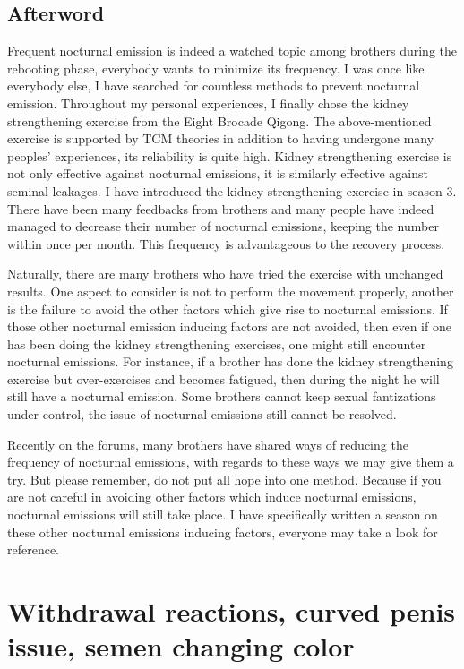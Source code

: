 \documentclass[
]{book}
\begin{document}
\hypertarget{afterword-6}{%
\section{Afterword}\label{afterword-6}}

Frequent nocturnal emission is indeed a watched topic among brothers during the rebooting phase, everybody wants to minimize its frequency. I was once like everybody else, I have searched for countless methods to prevent nocturnal emission. Throughout my personal experiences, I finally chose the kidney strengthening exercise from the Eight Brocade Qigong. The above-mentioned exercise is supported by TCM theories in addition to having undergone many peoples' experiences, its reliability is quite high. Kidney strengthening exercise is not only effective against nocturnal emissions, it is similarly effective against seminal leakages. I have introduced the kidney strengthening exercise in season 3. There have been many feedbacks from brothers and many people have indeed managed to decrease their number of nocturnal emissions, keeping the number within once per month. This frequency is advantageous to the recovery process.

Naturally, there are many brothers who have tried the exercise with unchanged results. One aspect to consider is not to perform the movement properly, another is the failure to avoid the other factors which give rise to nocturnal emissions. If those other nocturnal emission inducing factors are not avoided, then even if one has been doing the kidney strengthening exercises, one might still encounter nocturnal emissions. For instance, if a brother has done the kidney strengthening exercise but over-exercises and becomes fatigued, then during the night he will still have a nocturnal emission. Some brothers cannot keep sexual fantizations under control, the issue of nocturnal emissions still cannot be resolved.

Recently on the forums, many brothers have shared ways of reducing the frequency of nocturnal emissions, with regards to these ways we may give them a try. But please remember, do not put all hope into one method. Because if you are not careful in avoiding other factors which induce nocturnal emissions, nocturnal emissions will still take place. I have specifically written a season on these other nocturnal emissions inducing factors, everyone may take a look for reference.

\hypertarget{withdrawal-reactions-curved-penis-issue-semen-changing-color}{%
\chapter{Withdrawal reactions, curved penis issue, semen changing color}\label{withdrawal-reactions-curved-penis-issue-semen-changing-color}}
\end{document}
